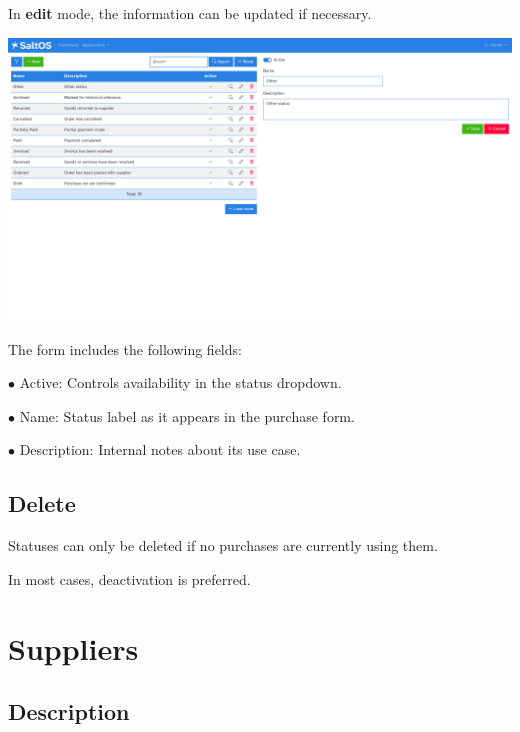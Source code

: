 \documentclass[a4paper]{article}
\begin{document}
In \textbf{edit} mode, the information can be updated if necessary.

\begin{center}\includegraphics[width=1\textwidth]{../ujest/snaps/test-screenshots-js-screenshots-purchases-purchase-status-edit-10-en-us-1-snap.png}\end{center}

The form includes the following fields:

\begin{compactitem}
\item[\color{myblue}$\bullet$] Active: Controls availability in the status dropdown.
\item[\color{myblue}$\bullet$] Name: Status label as it appears in the purchase form.
\item[\color{myblue}$\bullet$] Description: Internal notes about its use case.
\end{compactitem}

\hypertarget{toc125}{}
\subsection{Delete}

Statuses can only be deleted if no purchases are currently using them.

In most cases, deactivation is preferred.


\hypertarget{toc126}{}
\section{Suppliers}

\hypertarget{toc127}{}
\subsection{Description}
\end{document}
